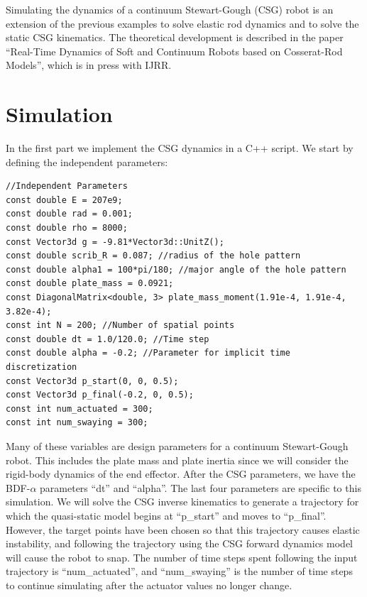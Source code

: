 \documentclass[12pt]{article}
\begin{document}
\makeatletter
\renewcommand{\@maketitle}{
\newpage
\null
\vskip 2em
\begin{center}
{\LARGE \@title \par}
\end{center}
\par
} \makeatother

\maketitle

Simulating the dynamics of a continuum Stewart-Gough (CSG) robot is an extension of the previous examples to solve elastic rod dynamics and to solve the static CSG kinematics. The theoretical development is described in the paper ``Real-Time Dynamics of Soft and Continuum Robots based on Cosserat-Rod Models'', which is in press with IJRR.

\section{Simulation}

In the first part we implement the CSG dynamics in a C++ script. We start by defining the independent parameters:
\begin{lstlisting}
//Independent Parameters
const double E = 207e9;
const double rad = 0.001;
const double rho = 8000;
const Vector3d g = -9.81*Vector3d::UnitZ();
const double scrib_R = 0.087; //radius of the hole pattern
const double alpha1 = 100*pi/180; //major angle of the hole pattern
const double plate_mass = 0.0921;
const DiagonalMatrix<double, 3> plate_mass_moment(1.91e-4, 1.91e-4, 3.82e-4);
const int N = 200; //Number of spatial points
const double dt = 1.0/120.0; //Time step
const double alpha = -0.2; //Parameter for implicit time discretization
const Vector3d p_start(0, 0, 0.5);
const Vector3d p_final(-0.2, 0, 0.5);
const int num_actuated = 300;
const int num_swaying = 300;
\end{lstlisting}
Many of these variables are design parameters for a continuum Stewart-Gough robot. This includes the plate mass and plate inertia since we will consider the rigid-body dynamics of the end effector. After the CSG parameters, we have the BDF-$\alpha$ parameters ``dt'' and ``alpha''. The last four parameters are specific to this simulation. We will solve the CSG inverse kinematics to generate a trajectory for which the quasi-static model begins at ``p\_start'' and moves to ``p\_final''. However, the target points have been chosen so that this trajectory causes elastic instability, and following the trajectory using the CSG forward dynamics model will cause the robot to snap. The number of time steps spent following the input trajectory is ``num\_actuated'', and ``num\_swaying'' is the number of time steps to continue simulating after the actuator values no longer change.
\end{document}
